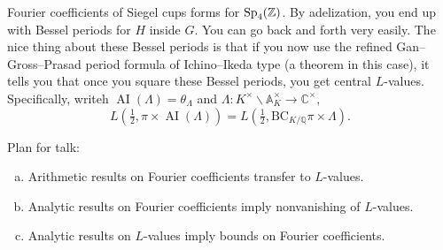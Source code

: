 \documentclass[reqno]{amsart} 
\begin{document}
Fourier coefficients of Siegel cups forms for $\operatorname{Sp}_4(\mathbb{Z})$.  By adelization, you end up with Bessel periods for $H$ inside $G$.  You can go back and forth very easily.  The nice thing about these Bessel periods is that if you now use the refined Gan--Gross--Prasad period formula of Ichino--Ikeda type (a theorem in this case), it tells you that once you square these Bessel periods, you get central $L$-values.  Specifically, writeh $\operatorname{AI}(\Lambda) = \theta_\Lambda$ and $\Lambda : K^\times \backslash \mathbb{A}_K^\times \rightarrow \mathbb{C}^\times$,
\begin{equation*}
  L(\tfrac{1}{2}, \pi \times \operatorname{AI}(\Lambda))
  =
  L(\tfrac{1}{2}, \mathrm{BC}_{K/\mathbb{Q}} \pi \times \Lambda).
\end{equation*}

Plan for talk:
\begin{enumerate}[(a)]
\item Arithmetic results on Fourier coefficients transfer to $L$-values.
\item Analytic results on Fourier coefficients imply nonvanishing of $L$-values.
\item Analytic results on $L$-values imply bounds on Fourier coefficients.
\end{enumerate}
\end{document}
